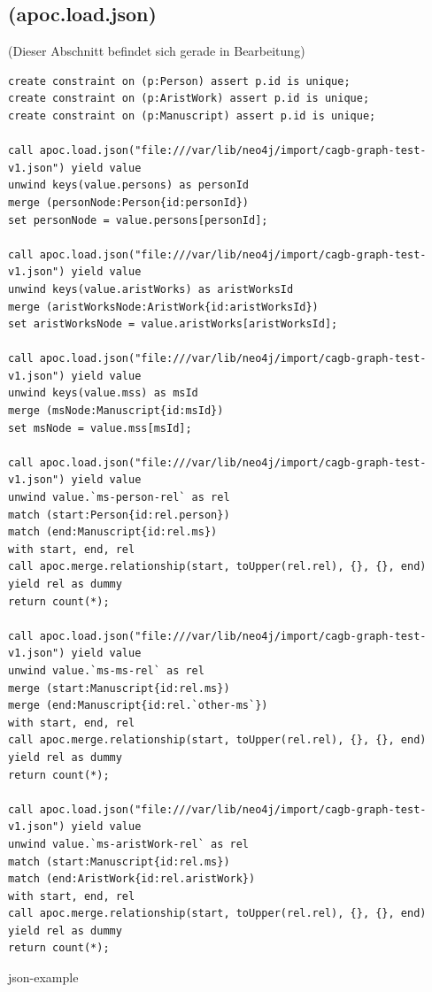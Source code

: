 \documentclass[12pt,ngerman,]{article}
\begin{document}
\subsection{(apoc.load.json)}\label{apoc.load.json}

(Dieser Abschnitt befindet sich gerade in Bearbeitung)

\begin{verbatim}
create constraint on (p:Person) assert p.id is unique;
create constraint on (p:AristWork) assert p.id is unique;
create constraint on (p:Manuscript) assert p.id is unique;

call apoc.load.json("file:///var/lib/neo4j/import/cagb-graph-test-v1.json") yield value
unwind keys(value.persons) as personId
merge (personNode:Person{id:personId})
set personNode = value.persons[personId];

call apoc.load.json("file:///var/lib/neo4j/import/cagb-graph-test-v1.json") yield value
unwind keys(value.aristWorks) as aristWorksId
merge (aristWorksNode:AristWork{id:aristWorksId})
set aristWorksNode = value.aristWorks[aristWorksId];

call apoc.load.json("file:///var/lib/neo4j/import/cagb-graph-test-v1.json") yield value
unwind keys(value.mss) as msId
merge (msNode:Manuscript{id:msId})
set msNode = value.mss[msId];

call apoc.load.json("file:///var/lib/neo4j/import/cagb-graph-test-v1.json") yield value
unwind value.`ms-person-rel` as rel
match (start:Person{id:rel.person})
match (end:Manuscript{id:rel.ms})
with start, end, rel
call apoc.merge.relationship(start, toUpper(rel.rel), {}, {}, end) yield rel as dummy
return count(*);

call apoc.load.json("file:///var/lib/neo4j/import/cagb-graph-test-v1.json") yield value
unwind value.`ms-ms-rel` as rel
merge (start:Manuscript{id:rel.ms})
merge (end:Manuscript{id:rel.`other-ms`})
with start, end, rel
call apoc.merge.relationship(start, toUpper(rel.rel), {}, {}, end) yield rel as dummy
return count(*);

call apoc.load.json("file:///var/lib/neo4j/import/cagb-graph-test-v1.json") yield value
unwind value.`ms-aristWork-rel` as rel
match (start:Manuscript{id:rel.ms})
match (end:AristWork{id:rel.aristWork})
with start, end, rel
call apoc.merge.relationship(start, toUpper(rel.rel), {}, {}, end) yield rel as dummy
return count(*);
\end{verbatim}

json-example
\end{document}
